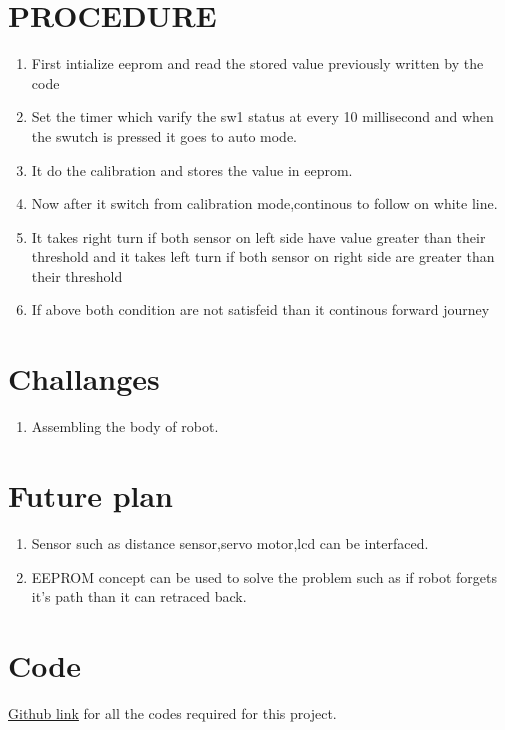 \documentclass[a4paper,12pt,oneside]{book}
\begin{document}
\section{PROCEDURE}
\begin{enumerate}
\item First intialize eeprom and read the stored value previously written by the code
\item Set the timer which varify the sw1 status at every 10 millisecond and when the swutch is pressed it goes to auto mode.
\item It do the calibration and stores the value in eeprom.
\item Now after it switch from calibration mode,continous to follow on white line.
\item It takes right turn if both sensor on left side have value greater than their threshold and it takes left turn if both sensor on right side are greater than their threshold
\item If above both condition are not satisfeid than it continous forward journey
\end{enumerate}
\section{Challanges}
\begin{enumerate}
\item Assembling the body of robot.
\end{enumerate}
\section{Future plan}
\begin{enumerate}
\item  Sensor such as distance sensor,servo motor,lcd can be interfaced.
\item EEPROM concept can be used to solve the problem such as if robot forgets it's path than it can retraced back.
\end{enumerate}
\section{Code}
\href{https://https://github.com/eYSIP-2016/eYSIP-2016-Around-the-world-of-Embedded-Systems/blob/origin/master/Solutions/Linefollower/linefollower.c}{Github link} for all the codes required for this project.





 
\end{document}
